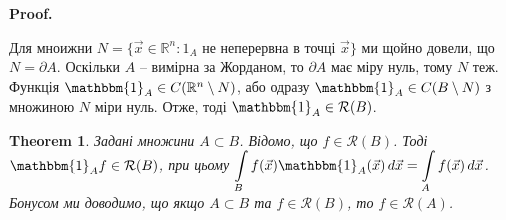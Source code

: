 \documentclass[a4paper, 10pt]{article}
\makeatletter
\def\qed{$\blacksquare$}
\theoremstyle{theoremdd}
\newtheorem{theorem}{Theorem}[subsection]
\theoremstyle{theoremdd}
\theoremstyle{theoremdd}
\theoremstyle{theoremdd}
\theoremstyle{theoremdd}
\theoremstyle{theoremdd}
\theoremstyle{theoremdd}
\theoremstyle{theoremdd}
\theoremstyle{theoremdd}
\theoremstyle{theoremdd}
\theoremstyle{theoremdd}
\theoremstyle{theoremdd}
\theoremstyle{theoremdd}
\theoremstyle{theoremdd}
\theoremstyle{theoremdd}
\renewenvironment{proof}[1][Proof.\\]{\par
\pushQED{\hfill \qed}%
\normalfont \topsep6\p@\@plus6\p@\relax
\trivlist
\item\relax
{\bfseries
#1\@addpunct{.}}\hspace\labelsep\ignorespaces
}{%
\popQED\endtrivlist\@endpefalse
}
\makeatother
\begin{document}
\begin{proof}
Для мноижни $N = \{ \vec{x} \in \mathbb{R}^n : 1_A \text{ не неперервна в точці } \vec{x} \}$ ми щойно довели, що $N = \partial A$. Оскільки $A$ -- вимірна за Жорданом, то $\partial A$ має міру нуль, тому $N$ теж. Функція $\mathbbm{1}_A \in C(\mathbb{R}^n \setminus N)$, або одразу $\mathbbm{1}_A \in C(B \setminus N)$ з множиною $N$ міри нуль. Отже, тоді $\mathbbm{1}_A \in \mathcal{R}(B)$.
\end{proof}

\begin{theorem}
Задані множини $A \subset B$. Відомо, що $f \in \mathcal{R}(B)$. Тоді $\mathbbm{1}_A f \in \mathcal{R}(B)$, при цьому $\displaystyle\int\displaylimits_B f(\vec{x})\mathbbm{1}_A(\vec{x})\,d\vec{x} = \int\displaylimits_A f(\vec{x})\,d\vec{x}$.\\
Бонусом ми доводимо, що якщо $A \subset B$ та $f \in \mathcal{R}(B)$, то $f \in \mathcal{R}(A)$.
\end{theorem}
\end{document}
